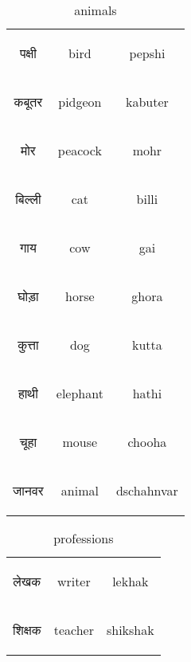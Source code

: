  \begin{table}[H]
    \centering 
    \begin{tabular}{c|c|c}
        \begin{hindi} पक्षी \end{hindi} & bird & pepshi \\
        \begin{hindi} कबूतर \end{hindi} & pidgeon & kabuter \\
        \begin{hindi}  मोर \end{hindi} & peacock & mohr \\
        \begin{hindi} बिल्ली \end{hindi} & cat & billi \\
        \begin{hindi}  गाय \end{hindi} & cow & gai \\
        \begin{hindi}  घोड़ा  \end{hindi} & horse& ghora  \\
        \begin{hindi}  कुत्ता \end{hindi} & dog & kutta \\
        \begin{hindi}  हाथी \end{hindi} & elephant & hathi \\
        \begin{hindi}  चूहा \end{hindi} & mouse & chooha \\
        \begin{hindi}  जानवर \end{hindi} & animal & dschahnvar \\
    \end{tabular}
    \caption{animals}
    \label{tab:nouns_animals}
\end{table}
 
 \begin{table}[H]
    \centering 
    \begin{tabular}{c|c|c}
        \begin{hindi} लेखक \end{hindi} & writer &  lekhak\\
        \begin{hindi} शिक्षक  \end{hindi} &  teacher & shikshak \\
    \end{tabular}
    \caption{professions}
    \label{tab:nouns_professions}
\end{table}


